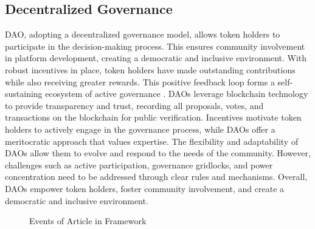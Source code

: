 \documentclass[lettersize,journal]{IEEEtran}
\begin{document}
\subsection{Decentralized Governance}

DAO, adopting a decentralized governance model, allows token holders to participate in the decision-making process. This ensures community involvement in platform development, creating a democratic and inclusive environment. With robust incentives in place, token holders have made outstanding contributions while also receiving greater rewards. This positive feedback loop forms a self-sustaining ecosystem of active governance \cite{beck2018governance}. DAOs leverage blockchain technology to provide transparency and trust, recording all proposals, votes, and transactions on the blockchain for public verification. Incentives motivate token holders to actively engage in the governance process, while DAOs offer a meritocratic approach that values expertise. The flexibility and adaptability of DAOs allow them to evolve and respond to the needs of the community. However, challenges such as active participation, governance gridlocks, and power concentration need to be addressed through clear rules and mechanisms. Overall, DAOs empower token holders, foster community involvement, and create a democratic and inclusive environment.

\begin{figure}[ht]
  \caption{Events of Article in Framework}
  \label{fig:decentralized_governance}
\end{figure}
\end{document}

